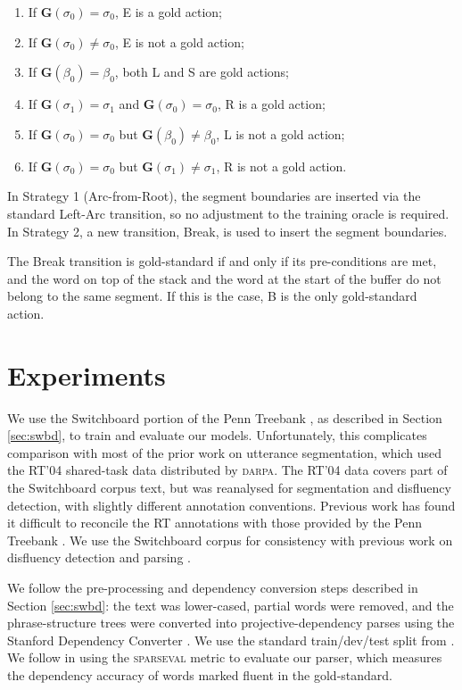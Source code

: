 \documentclass[11pt,letterpaper]{article}
\newcommand{\sparseval}{\textsc{sparseval}\xspace}
\begin{document}
\begin{enumerate}
    \item If $\mathbf{G}(\sigma_0) = \sigma_0$, E is a gold action;
    \item If $\mathbf{G}(\sigma_0) \not= \sigma_0$, E is not a gold action;
    \item If $\mathbf{G}(\beta_0) = \beta_0$, both L and S are gold actions;
    \item If $\mathbf{G}(\sigma_1)= \sigma_1$ and $\mathbf{G}(\sigma_0) = \sigma_0$, R
        is a gold action;
    \item If $\mathbf{G}(\sigma_0) = \sigma_0$ but $\mathbf{G}(\beta_0) \not= \beta_0$,
          L is not a gold action;
      \item If $\mathbf{G}(\sigma_0) = \sigma_0$ but $\mathbf{G}(\sigma_1) \not= \sigma_1$,
          R is not a gold action.
\end{enumerate}

\noindent In Strategy 1 (Arc-from-Root), the segment boundaries are inserted
via the standard Left-Arc transition, so no adjustment to the training oracle
is required.  In Strategy 2, a new transition, Break, is used to insert the
segment boundaries. 

The Break transition is gold-standard if and only if its pre-conditions
are met, and the word on top of the stack and the word at the start of the buffer
do not belong to the same segment.  If this is the case, B is the only gold-standard
action.

\section{Experiments}

We use the Switchboard portion of the Penn Treebank \citep{marcus:93}, as
described in Section \ref{sec:swbd}, to train and evaluate our models.  Unfortunately,
this complicates comparison with most of the prior work on utterance segmentation,
which used the RT'04 shared-task data distributed by \textsc{darpa}.
The RT'04 data covers part of the Switchboard corpus text, but was reanalysed
for segmentation and disfluency detection, with slightly different annotation
conventions.  Previous work has found it difficult to reconcile the RT annotations
with those provided by the Penn Treebank \citep{kahn:thesis05}.
We use
the Switchboard corpus for consistency with previous work on disfluency 
detection and parsing \citep{qian:13,rasooli:13,honnibal:14}.

We follow the pre-processing and dependency conversion steps described in
Section \ref{sec:swbd}: the text was lower-cased, partial words were removed,
and the phrase-structure trees were converted into projective-dependency parses
using the Stanford Dependency Converter \citep{stanford_deps}.
We use the standard train/dev/test split from \citet{Charniak01a}.
We follow \citet{honnibal:14} in using the \sparseval \citep{sparseval}
metric to evaluate our parser, which measures the dependency
accuracy of words marked fluent in the gold-standard.
\end{document}
